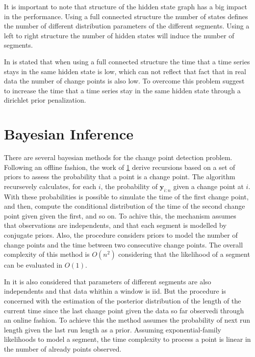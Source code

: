 It is important to note that structure of the hidden state graph has a big impact in the performance. Using a full connected structure the number of states defines the number of different distribution parameters of the different segments. Using a left to right structure the number of hidden states will induce the number of segments.

In \cite{inertial_hidden_markov_models_modeling_change_in_multivariate_time_series} is stated that when using a full connected structure the time that a time series stays in the same hidden state is low, which can not reflect that fact that in real data the number of change points is also low. To overcome this problem \cite{inertial_hidden_markov_models_modeling_change_in_multivariate_time_series} suggest to increase the time that a time series stay in the same hidden state through a dirichlet prior penalization.

\section{Bayesian Inference}

There are several bayesian methods for the change point detection problem. Following an offline fashion, the work of \ref{} derive recursions based on a set of priors to assess the probability that a point is a change point. The algorithm recursevely calculates, for each $i$, the probability of $\mathbf{y}_{i : n}$ given a change point at $i$. With these probabilities is possible to simulate the time of the first change point, and then, compute the conditional distribution of the time of the second change point given given the first, and so on. To achive this, the mechanism assumes that observations are independents, and that each segment is modelled by conjugate priors. Also, the procedure considers priors to model the number of change points and the time between two consecutive change points. The overall complexity of this method is $O(n^{2})$ considering that the likelihood of a segment can be evaluated in $O(1)$.

In \cite{bayesian_online_changepoint_detection} it is also considered that parameters of different segments are also independents and that data whithin a window is iid. But the procedure is concerned with the estimation of the posterior distribution of the length of the current time since the last change point given the data so far observedi through an online fashion. To achieve this the method assumes the probability of next run length given the last run length as a prior. Assuming exponential-family likelihoods to model a segment, the time complexity to process a point is linear in the number of already points observed. 
